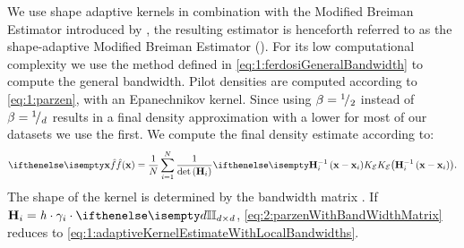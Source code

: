 
	We use shape adaptive kernels in combination with the Modified Breiman Estimator introduced by \textcite{wilkinson1995dataplot}, the resulting estimator is henceforth referred to as the shape-adaptive Modified Breiman Estimator (\sambe). 
	For its low computational complexity we use the method defined in \cref{eq:1:ferdosiGeneralBandwidth} to compute the general bandwidth. 
	Pilot densities are computed according to \cref{eq:1:parzen}, with an Epanechnikov kernel.
	Since using $\beta = {}^{1}\!/_{2}$ instead of $\beta = {}^{1}\!/_{d}$ results in a final density approximation with a lower \mse for most of our datasets we use the first.
	We compute the final density estimate according to:
	\begin{equation}\label{eq:2:parzenWithBandWidthMatrix}
		\varEstimatedDensityFunction{\varPattern} = \frac{1}{\varNumPatterns}\sum_{\itXis = 1}^{\varNumPatterns} \frac{1}{\det\left(\varBandwidthMatrix[\itXis]\right)}\varKernel[\varEpan]{\varBandwidthMatrix[\itXis]^{-1}\left(\varPattern - \varPattern[\itXis]\right)}.
	\end{equation}
	The shape of the kernel \varKernel[\varEpan]{\bullet} is determined by the bandwidth matrix \varBandwidthMatrix[\itXis] \cite{hardle2012nonparametric}. If $\varBandwidthMatrix[\itXis] = \varBandwidth \cdot \varLocalBandwidth{\itXis} \cdot \identityMatrix{\varDim}$, \cref{eq:2:parzenWithBandWidthMatrix} reduces to \cref{eq:1:adaptiveKernelEstimateWithLocalBandwidths}.
	

